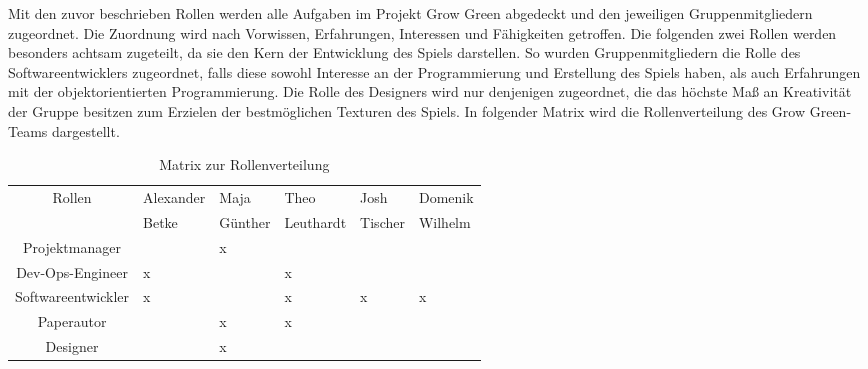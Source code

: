 \vspace{5cm}

Mit den zuvor beschrieben Rollen werden alle Aufgaben im Projekt Grow Green abgedeckt und
den jeweiligen Gruppenmitgliedern zugeordnet. 
Die Zuordnung wird nach Vorwissen, Erfahrungen, Interessen und Fähigkeiten getroffen. 
Die folgenden zwei Rollen werden besonders achtsam zugeteilt, da sie den Kern der Entwicklung des Spiels darstellen.
So wurden Gruppenmitgliedern die Rolle des Softwareentwicklers zugeordnet, falls diese sowohl Interesse
an der Programmierung und Erstellung des Spiels haben, als auch Erfahrungen mit der 
objektorientierten Programmierung.
Die Rolle des Designers wird nur denjenigen zugeordnet, die das höchste Maß an Kreativität der Gruppe besitzen
zum Erzielen der bestmöglichen Texturen des Spiels.
In folgender Matrix wird die Rollenverteilung des Grow Green-Teams dargestellt.

\vspace{2cm}

\begin{table}[H]
    \begin{center}
        \label{tab:rollenverteilung}
        \begin{tabular}{|c|p{2cm}|p{2cm}|p{2cm}|p{2cm}|p{2cm}|}
            \hline
            Rollen 
            & Alexander 
            & Maja 
            & Theo 
            & Josh 
            & Domenik \\
            & Betke
            & Günther
            & Leuthardt
            & Tischer
            & Wilhelm \\
            \hline
            \hline
            Projektmanager &  & x &  &  &  \\
            Dev-Ops-Engineer & x &  & x &  &  \\
            Softwareentwickler & x &  & x & x & x \\
            Paperautor &  & x & x &  &  \\
            Designer &  & x &  &  &  \\
            \hline
        \end{tabular}
        \caption{Matrix zur Rollenverteilung}
    \end{center}
\end{table}